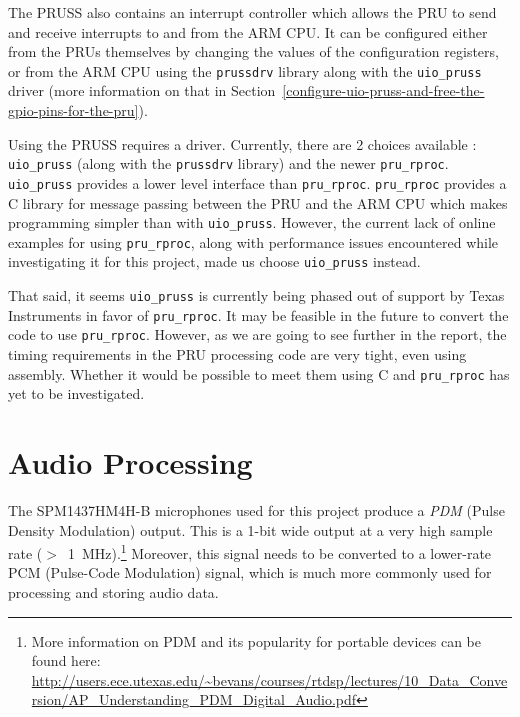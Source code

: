 \documentclass[]{report}
\begin{document}
The PRUSS also contains an interrupt controller which allows the PRU to send and receive interrupts to and from the ARM CPU. It can be configured either from the PRUs themselves by changing the values of the configuration registers, or from the ARM CPU using the \texttt{prussdrv} library along with the \texttt{uio\_pruss} driver (more information on that in Section~\ref{configure-uio-pruss-and-free-the-gpio-pins-for-the-pru}).

Using the PRUSS requires a driver. Currently, there are 2 choices available : \texttt{uio\_pruss} (along with the \texttt{prussdrv} library) and the newer \texttt{pru\_rproc}. \texttt{uio\_pruss} provides a lower level interface than \texttt{pru\_rproc}. \texttt{pru\_rproc} provides a C library for message passing between the PRU and the ARM CPU which makes programming simpler than with \texttt{uio\_pruss}. However, the current lack of online examples for using \texttt{pru\_rproc}, along with performance issues encountered while investigating it for this project, made us choose \texttt{uio\_pruss} instead.

That said, it seems \texttt{uio\_pruss} is currently being phased out of support by Texas Instruments in favor of \texttt{pru\_rproc}. It may be feasible in the future to convert the code to use \texttt{pru\_rproc}. However, as we are going to see further in the report, the timing requirements in the PRU processing code are very tight, even using assembly. Whether it would be possible to meet them using C and \texttt{pru\_rproc} has yet to be investigated.

\hypertarget{audio-processing}{%
\section{Audio Processing}\label{audio-processing}}

The SPM1437HM4H-B microphones used for this project produce a \emph{PDM} (Pulse Density Modulation) output. This is a 1-bit wide output at a very high sample rate ($ > $~1~MHz).\footnote{More information on PDM and its popularity for portable devices can be found here: \url{http://users.ece.utexas.edu/~bevans/courses/rtdsp/lectures/10_Data_Conversion/AP_Understanding_PDM_Digital_Audio.pdf}} Moreover, this signal needs to be converted to a lower-rate PCM (Pulse-Code Modulation) signal, which is much more commonly used for processing and storing audio data.
\end{document}
